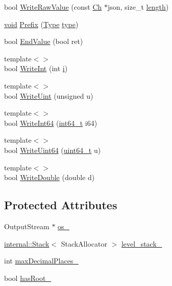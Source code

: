 \begin{DoxyCompactItemize}
\item 
bool \hyperlink{classWriter_a8ee1135b2595261819b134907f67614e}{Write\+Raw\+Value} (const \hyperlink{classWriter_ab08bff5fd2daec65f4a78779ca3d2139}{Ch} $\ast$json, size\+\_\+t \hyperlink{imgui__impl__opengl3__loader_8h_a011fc24f10426c01349e94a4edd4b0d5}{length})
\item 
\hyperlink{imgui__impl__opengl3__loader_8h_ac668e7cffd9e2e9cfee428b9b2f34fa7}{void} \hyperlink{classWriter_a1fc40f8b9f3abc2548c0c5782ce1755d}{Prefix} (\hyperlink{rapidjson_8h_a1d1cfd8ffb84e947f82999c682b666a7}{Type} \hyperlink{imgui__impl__opengl3__loader_8h_a63267399cd2a2ee217572c11d2e54f07}{type})
\item 
bool \hyperlink{classWriter_adc1cadbabc309d31f19cf7463251d879}{End\+Value} (bool ret)
\item 
{\footnotesize template$<$$>$ }\\bool \hyperlink{classWriter_abefb163a93b376d056edecad5a7a82ef}{Write\+Int} (int \hyperlink{game__play__state_8cpp_acb559820d9ca11295b4500f179ef6392}{i})
\item 
{\footnotesize template$<$$>$ }\\bool \hyperlink{classWriter_a9665a4a1549b286944b21927b80060cf}{Write\+Uint} (unsigned u)
\item 
{\footnotesize template$<$$>$ }\\bool \hyperlink{classWriter_a3528a42394d50f3b92659de517433c85}{Write\+Int64} (\hyperlink{stdint_8h_a414156feea104f8f75b4ed9e3121b2f6}{int64\+\_\+t} i64)
\item 
{\footnotesize template$<$$>$ }\\bool \hyperlink{classWriter_a025b3d2ca07d539a7067575e95f5578d}{Write\+Uint64} (\hyperlink{stdint_8h_aec6fcb673ff035718c238c8c9d544c47}{uint64\+\_\+t} u)
\item 
{\footnotesize template$<$$>$ }\\bool \hyperlink{classWriter_af317e1d24249b8c68503a6253c703bd2}{Write\+Double} (double d)
\end{DoxyCompactItemize}
\subsection*{Protected Attributes}
\begin{DoxyCompactItemize}
\item 
Output\+Stream $\ast$ \hyperlink{classWriter_a3a3f60140f78dd67b5274978fd3a33ff}{os\+\_\+}
\item 
\hyperlink{classinternal_1_1Stack}{internal\+::\+Stack}$<$ Stack\+Allocator $>$ \hyperlink{classWriter_a9e6c13c06fc721dfd8486f17b9ff29de}{level\+\_\+stack\+\_\+}
\item 
int \hyperlink{classWriter_a3d4ef664c3cdf34a286b13d27adcdd4d}{max\+Decimal\+Places\+\_\+}
\item 
bool \hyperlink{classWriter_affc6b9e0332b50bee0d33f8b1841c9a6}{has\+Root\+\_\+}
\end{DoxyCompactItemize}
